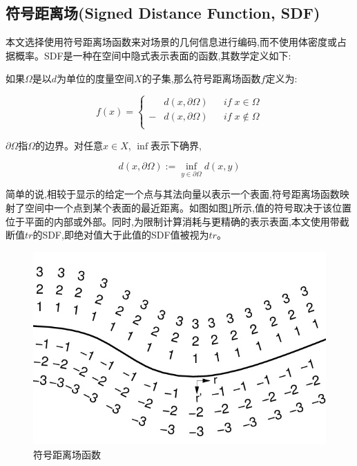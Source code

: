\subsection{符号距离场(Signed Distance Function, SDF)}
本文选择使用符号距离场函数\cite{sdf}来对场景的几何信息进行编码,而不使用体密度或占据概率。SDF是一种在空间中隐式表示表面的函数,其数学定义如下:

如果$\Omega$是以$d$为单位的度量空间$X$的子集,那么符号距离场函数$f$定义为:

$$f(x) = \left\{
\begin{aligned}
&d(x,\partial\Omega)&&if\; x\in\Omega \\
-&d(x,\partial\Omega)&&if\; x\notin\Omega\\
\end{aligned}
\right.
$$

$\partial\Omega$指$\Omega$的边界。对任意$x\in X$, $\inf$表示下确界,

$$
d(x,\partial\Omega) := \inf_{y\in \partial\Omega}d(x,y)
$$

简单的说,相较于显示的给定一个点与其法向量以表示一个表面,符号距离场函数映射了空间中一个点到某个表面的最近距离。如图如图\ref{sdf_figure}所示,值的符号取决于该位置位于平面的内部或外部。同时,为限制计算消耗与更精确的表示表面,本文使用带截断值$tr$的SDF,即绝对值大于此值的SDF值被视为$tr$。
\begin{figure}[htbp]
    \centering
    \includegraphics[scale=0.3]{figures/sdf_figure.jpeg}
    \caption{符号距离场函数}\label{sdf_figure}
\end{figure}
